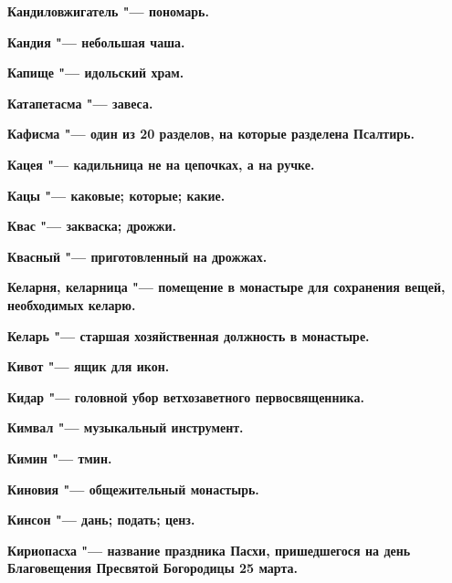 \begin{mymulticols}{2}
\bfseries Кандиловжигатель\normalfont{} "--- пономарь. 




\bfseries Кандия\normalfont{} "--- небольшая чаша. 




\bfseries Капище\normalfont{} "--- идольский храм. 




\bfseries Катапетасма\normalfont{} "--- завеса. 




\bfseries Кафисма\normalfont{} "--- один из 20 разделов, на которые разделена Псалтирь. 




\bfseries Кацея\normalfont{} "--- кадильница не на цепочках, а на ручке. 




\bfseries Кацы\normalfont{} "--- каковые; которые; какие. 




\bfseries Квас\normalfont{} "--- закваска; дрожжи. 




\bfseries Квасный\normalfont{} "--- приготовленный на дрожжах. 




\bfseries Келарня, келарница\normalfont{} "--- помещение в монастыре для сохранения вещей, необходимых келарю. 




\bfseries Келарь\normalfont{} "--- старшая хозяйственная должность в монастыре. 




\bfseries Кивот\normalfont{} "--- ящик для икон. 




\bfseries Кидар\normalfont{} "--- головной убор ветхозаветного первосвященника. 




\bfseries Кимвал\normalfont{} "--- музыкальный инструмент. 




\bfseries Кимин\normalfont{} "--- тмин. 




\bfseries Киновия\normalfont{} "--- общежительный монастырь. 




\bfseries Кинсон\normalfont{} "--- дань; подать; ценз. 




\bfseries Кириопасха\normalfont{} "--- название праздника Пасхи, пришедшегося на день Благовещения Пресвятой Богородицы 25 марта. 





\end{mymulticols}
